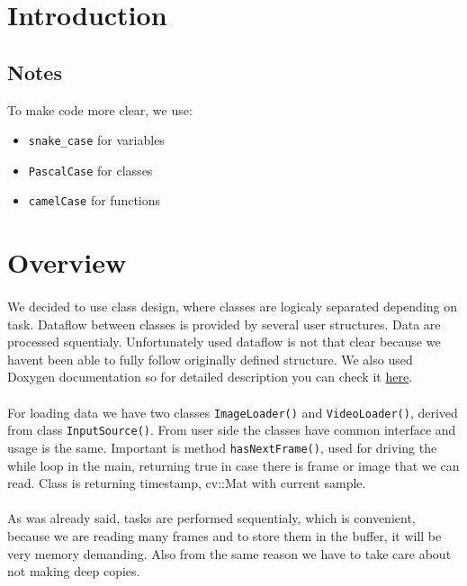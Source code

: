 \documentclass[english]{article}
\begin{document}
\tableofcontents
\newpage

\section{Introduction}

\subsection{Notes}
To make code more clear, we use:
\begin{itemize}
	\item \texttt{snake\_case} for variables
	\item \texttt{PascalCase} for classes
	\item \texttt{camelCase} for functions
\end{itemize}

\section{Overview}
\paragraph{}
We decided to use class design, where classes are logicaly separated depending on task.
Dataflow between classes is provided by several user structures. Data are processed squentialy.
Unfortunately used dataflow is not that clear because we havent been able to fully follow originally defined structure.
We also used Doxygen documentation so for detailed description you can check it \href{run:../latex/refman.pdf}{here}.
\paragraph{}
	For loading data we have two classes \texttt{ImageLoader()} and \texttt{VideoLoader()}, derived from class \texttt{InputSource()}.
	From user side the classes have common interface and usage is the same. Important is method \texttt{hasNextFrame()}, used for
	driving the while loop in the main, returning true in case there is frame or image that we can read. Class is returning timestamp,
	cv::Mat with current sample.

\paragraph{}
	As was already said, tasks are performed sequentialy, which is convenient, because we are reading many frames and to store them in the buffer,
	it will be very memory demanding. Also from the same reason we have to take care about not making deep copies.
\end{document}

